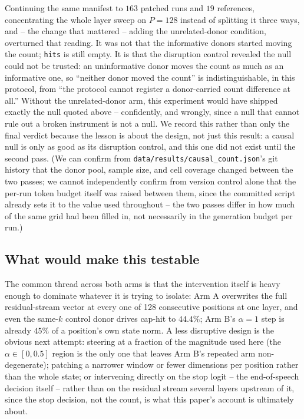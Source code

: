 \documentclass[11pt]{article}
\begin{document}
Continuing the same manifest to $163$ patched runs and $19$ references,
concentrating the whole layer sweep on $P{=}128$ instead of splitting it three
ways, and -- the change that mattered -- adding the unrelated-donor condition,
overturned that reading. It was not that the informative donors started moving
the count; \texttt{hits} is still empty. It is that the disruption control
revealed the null could not be trusted: an uninformative donor moves the count
as much as an informative one, so ``neither donor moved the count'' is
indistinguishable, in this protocol, from ``the protocol cannot register a
donor-carried count difference at all.'' Without the unrelated-donor arm, this
experiment would have shipped exactly the null quoted above -- confidently, and
wrongly, since a null that cannot rule out a broken instrument is not a null.
We record this rather than only the final verdict because the lesson is about
the design, not just this result: a causal null is only as good as its
disruption control, and this one did not exist until the second pass. (We can
confirm from \texttt{data/results/causal\_count.json}'s git history that the
donor pool, sample size, and cell coverage changed between the two passes; we
cannot independently confirm from version control alone that the per-run token
budget itself was raised between them, since the committed script already sets
it to the value used throughout -- the two passes differ in how much of the
same grid had been filled in, not necessarily in the generation budget per run.)

\subsection{What would make this testable}

The common thread across both arms is that the intervention itself is heavy
enough to dominate whatever it is trying to isolate: Arm A overwrites the full
residual-stream vector at every one of 128 consecutive positions at one layer,
and even the same-$k$ control donor drives cap-hit to $44.4\%$; Arm B's
$\alpha{=}1$ step is already $45\%$ of a position's own state norm. A less
disruptive design is the obvious next attempt: steering at a fraction of the
magnitude used here (the $\alpha\in[0,0.5]$ region is the only one that leaves
Arm B's repeated arm non-degenerate); patching a narrower window or fewer
dimensions per position rather than the whole state; or intervening directly on
the stop logit -- the end-of-speech decision itself -- rather than on the
residual stream several layers upstream of it, since the stop decision, not the
count, is what this paper's account is ultimately about.
\end{document}

